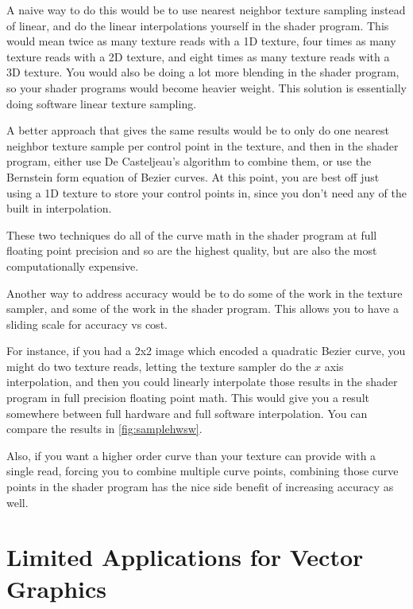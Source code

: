 \documentclass{jcgt}
\begin{document}
A naive way to do this would be to use nearest neighbor texture sampling instead of linear, and do the linear interpolations yourself in the shader program.  This would mean twice as many texture reads with a 1D texture, four times as many texture reads with a 2D texture, and eight times as many texture reads with a 3D texture.  You would also be doing a lot more blending in the shader program, so your shader programs would become heavier weight.  This solution is essentially doing software linear texture sampling.

A better approach that gives the same results would be to only do one nearest neighbor texture sample per control point in the texture, and then in the shader program, either use De Casteljeau's algorithm to combine them, or use the Bernstein form equation of Bezier curves.  At this point, you are best off just using a 1D texture to store your control points in, since you don't need any of the built in interpolation.

These two techniques do all of the curve math in the shader program at full floating point precision and so are the highest quality, but are also the most computationally expensive.

Another way to address accuracy would be to do some of the work in the texture sampler, and some of the work in the shader program.  This allows you to have a sliding scale for accuracy vs cost.

For instance, if you had a 2x2 image which encoded a quadratic Bezier curve, you might do two texture reads, letting the texture sampler do the $x$ axis interpolation, and then you could linearly interpolate those results in the shader program in full precision floating point math.  This would give you a result somewhere between full hardware and full software interpolation.  You can compare the results in \autoref{fig:samplehwsw}.

Also, if you want a higher order curve than your texture can provide with a single read, forcing you to combine multiple curve points, combining those curve points in the shader program has the nice side benefit of increasing accuracy as well.

\section{Limited Applications for Vector Graphics}
\label{sec:limitedapplicationsforvectorgraphics}
\end{document}
